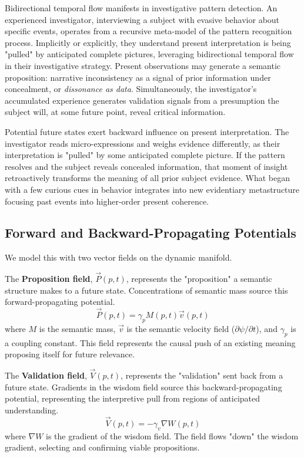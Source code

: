 Bidirectional temporal flow manifests in investigative pattern detection. An experienced investigator, interviewing a subject with evasive behavior about specific events, operates from a recursive meta-model of the pattern recognition process. Implicitly or explicitly, they understand present interpretation is being "pulled" by anticipated complete pictures, leveraging bidirectional temporal flow in their investigative strategy. Present observations may generate a semantic proposition: narrative inconsistency as a signal of prior information under concealment, or \textit{dissonance as data}. Simultaneously, the investigator's accumulated experience generates validation signals from a presumption the subject will, at some future point, reveal critical information.

Potential future states exert backward influence on present interpretation. The investigator reads micro-expressions and weighs evidence differently, as their interpretation is "pulled" by some anticipated complete picture. If the pattern resolves and the subject reveals concealed information, that moment of insight retroactively transforms the meaning of all prior subject evidence. What began with a few curious cues in behavior integrates into new evidentiary metastructure focusing past events into higher-order present coherence.


\subsection{Forward and Backward-Propagating Potentials}
\label{sec:forward_and_backward_propagating_potentials}

We model this with two vector fields on the dynamic manifold.

The \textbf{Proposition field}, \(\vec{P}(p,t)\), represents the "proposition" a semantic structure makes to a future state. Concentrations of semantic mass source this forward-propagating potential.
\begin{equation}
\vec{P}(p,t) = \gamma_p M(p,t) \vec{v}(p,t)
\end{equation}
where \(M\) is the semantic mass, \(\vec{v}\) is the semantic velocity field (\(\partial\psi/\partial t\)), and \(\gamma_p\) is a coupling constant. This field represents the causal push of an existing meaning proposing itself for future relevance.

The \textbf{Validation field}, \(\vec{V}(p,t)\), represents the "validation" sent back from a future state. Gradients in the wisdom field source this backward-propagating potential, representing the interpretive pull from regions of anticipated understanding.
\begin{equation}
\vec{V}(p,t) = -\gamma_v \nabla W(p,t)
\end{equation}
where \(\nabla W\) is the gradient of the wisdom field. The field flows "down" the wisdom gradient, selecting and confirming viable propositions.

